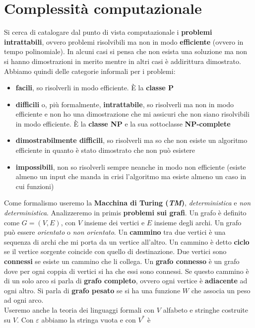 \documentclass[a4paper,12pt, oneside]{book}
\begin{document}
\chapter{Complessità computazionale}
Si cerca di catalogare dal punto di vista computazionale i \textbf{problemi
  intrattabili}, ovvero problemi risolvibili ma non in modo \textbf{efficiente}
(ovvero in tempo polinomiale). In alcuni casi si pensa che non esista una
soluzione ma non si hanno dimostrazioni in merito mentre in altri casi è
addirittura dimostrato. Abbiamo quindi delle categorie informali per i problemi:
\begin{itemize}
  \item \textbf{facili}, so risolverli in modo efficiente. È la \textbf{classe P}
  \item \textbf{difficili} o, più formalmente, \textbf{intrattabile}, so
  risolverli ma non in modo efficiente e non ho una 
  dimostrazione che mi assicuri che non siano risolvibili in modo efficiente. È
  la \textbf{classe NP} e la sua sottoclasse \textbf{NP-complete}
  \item \textbf{dimostrabilmente difficili}, so risolverli ma so che non esiste
  un algoritmo efficiente in quanto è stato dimostrato che non può esistere
  \item \textbf{impossibili}, non so risolverli sempre neanche in modo non
  efficiente (esiste almeno un input che manda in crisi l'algoritmo ma esiste
  almeno un caso in cui funzioni)
\end{itemize}
Come formalismo useremo la \textbf{Macchina di Turing (\textit{TM})},
\textit{deterministica} e \textit{non deterministica}. Analizzeremo in primis
\textbf{problemi sui grafi}. Un grafo è definito come $G=(V,E)$, con $V$ insieme
dei vertici e $E$ insieme degli archi. Un grafo può essere \textit{orientato} o
\textit{non orientato}. Un \textbf{cammino} tra due vertici è una sequenza di
archi che mi porta da un vertice all'altro. Un cammino è detto \textbf{ciclo} se
il vertice sorgente coincide con quello di destinazione. Due vertici sono
\textbf{connessi} se esiste un cammino che li collega. Un \textbf{grafo
  connesso} è un grafo dove per ogni coppia di vertici si ha che essi sono
connessi. Se questo cammino è di un solo arco si parla di \textbf{grafo
  completo}, ovvero ogni vertice è \textbf{adiacente} ad ogni altro. Si parla di
\textbf{grafo pesato} se si ha una funzione $W$ che associa un peso ad ogni
arco. \\
Useremo anche la teoria dei linguaggi formali con $V$ alfabeto e stringhe
costruite su $V$. Con $\varepsilon$ abbiamo la stringa vuota e con $V^*$ è
\end{document}
